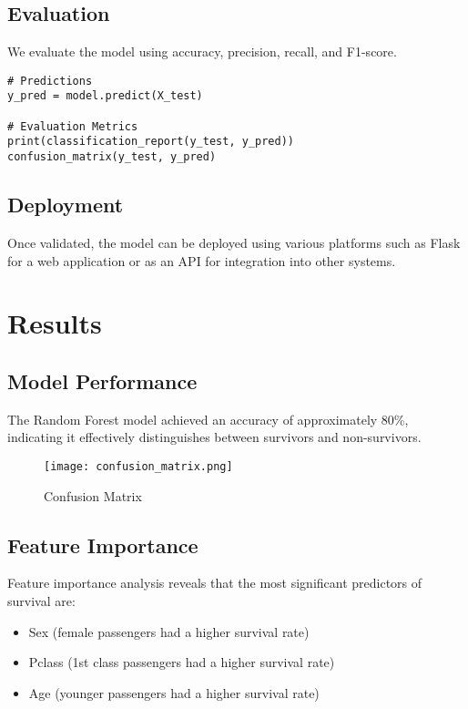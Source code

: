 \documentclass{article}
\begin{document}
\subsection{Evaluation}
We evaluate the model using accuracy, precision, recall, and F1-score.

\begin{verbatim}
# Predictions
y_pred = model.predict(X_test)

# Evaluation Metrics
print(classification_report(y_test, y_pred))
confusion_matrix(y_test, y_pred)
\end{verbatim}

\subsection{Deployment}
Once validated, the model can be deployed using various platforms such as Flask for a web application or as an API for integration into other systems.

\section{Results}

\subsection{Model Performance}
The Random Forest model achieved an accuracy of approximately 80\%, indicating it effectively distinguishes between survivors and non-survivors.

\begin{figure}[h]
    \centering
    \texttt{[image: confusion\_matrix.png]}
    \caption{Confusion Matrix}
\end{figure}


\subsection{Feature Importance}
Feature importance analysis reveals that the most significant predictors of survival are:

\begin{itemize}
    \item Sex (female passengers had a higher survival rate)
    \item Pclass (1st class passengers had a higher survival rate)
    \item Age (younger passengers had a higher survival rate)
\end{itemize}
\end{document}
